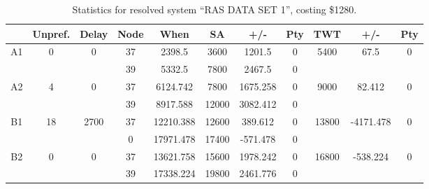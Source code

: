 \begin{sidewaystable}
\footnotesize
\caption{Statistics for resolved system ``RAS DATA SET 1'', costing \$1280.}
\centering
\begin{tabular}{c||c|c||c|c|c|c|c||c|c|c}
  \hline \hline
  &
  Unpref. & 
  Delay &
  Node &
  When &
  SA &
  +/- &
  Pty &
  TWT &
  +/- &
  Pty \\
      \hline
      \multirow{2}{*}{A1} &
      \multirow{2}{*}{0} &
      \multirow{2}{*}{0} &
      37 &
      2398.5 &
      3600 &
        1201.5 &
        0 &
      \multirow{2}{*}{5400} &
        \multirow{2}{*}{67.5} &
        \multirow{2}{*}{0}
      \\
      \cline{4-8}
       &
       &
       &
      39 &
      5332.5 &
      7800 &
        2467.5 &
        0 &
      
         &
        
      \\
      \hline
      \multirow{2}{*}{A2} &
      \multirow{2}{*}{4} &
      \multirow{2}{*}{0} &
      37 &
      6124.742 &
      7800 &
        1675.258 &
        0 &
      \multirow{2}{*}{9000} &
        \multirow{2}{*}{82.412} &
        \multirow{2}{*}{0}
      \\
      \cline{4-8}
       &
       &
       &
      39 &
      8917.588 &
      12000 &
        3082.412 &
        0 &
      
         &
        
      \\
      \hline
      \multirow{2}{*}{B1} &
      \multirow{2}{*}{18} &
      \multirow{2}{*}{2700} &
      37 &
      12210.388 &
      12600 &
        389.612 &
        0 &
      \multirow{2}{*}{13800} &
        \multirow{2}{*}{-4171.478} &
        \multirow{2}{*}{0}
      \\
      \cline{4-8}
       &
       &
       &
      0 &
      17971.478 &
      17400 &
        -571.478 &
        0 &
      
         &
        
      \\
      \hline
      \multirow{2}{*}{B2} &
      \multirow{2}{*}{0} &
      \multirow{2}{*}{0} &
      37 &
      13621.758 &
      15600 &
        1978.242 &
        0 &
      \multirow{2}{*}{16800} &
        \multirow{2}{*}{-538.224} &
        \multirow{2}{*}{0}
      \\
      \cline{4-8}
       &
       &
       &
      39 &
      17338.224 &
      19800 &
        2461.776 &
        0 &
      

\end{tabular}
\end{sidewaystable}

